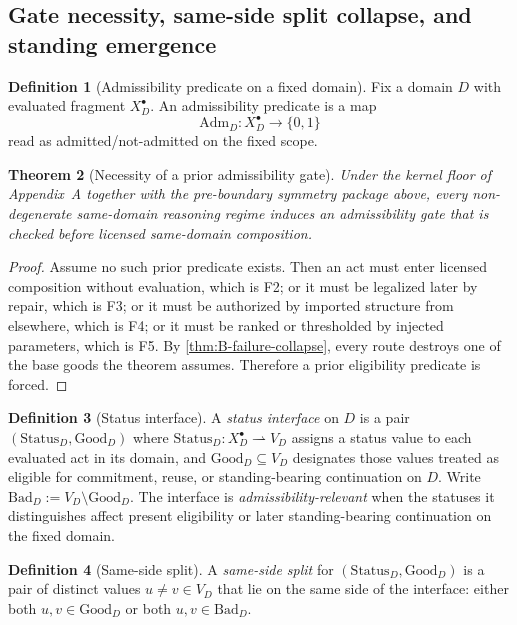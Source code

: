 \documentclass[11pt]{article}
\theoremstyle{plain}
\newtheorem{theorem}{Theorem}[section]
\theoremstyle{definition}
\newtheorem{definition}[theorem]{Definition}
\newcommand{\Adm}{\mathrm{Adm}}
\newcommand{\Eval}{X_D^{\bullet}}
\newcommand{\domain}{D}
\newcommand{\Good}{\mathrm{Good}}
\newcommand{\Bad}{\mathrm{Bad}}
\begin{document}
\subsection{Gate necessity, same-side split collapse, and standing emergence}

\begin{definition}[Admissibility predicate on a fixed domain]
Fix a domain $\domain$ with evaluated fragment $\Eval$. An admissibility predicate is a map
\[
\Adm_\domain:\Eval\to\{0,1\}
\]
read as admitted/not-admitted on the fixed scope.
\end{definition}

\begin{theorem}[Necessity of a prior admissibility gate]
\label{thm:B-gate-necessity}
Under the kernel floor of Appendix~A together with the pre-boundary symmetry package above, every non-degenerate same-domain reasoning regime induces an admissibility gate that is checked before licensed same-domain composition.
\end{theorem}

\begin{proof}
Assume no such prior predicate exists. Then an act must enter licensed composition without evaluation, which is F2; or it must be legalized later by repair, which is F3; or it must be authorized by imported structure from elsewhere, which is F4; or it must be ranked or thresholded by injected parameters, which is F5. By \cref{thm:B-failure-collapse}, every route destroys one of the base goods the theorem assumes. Therefore a prior eligibility predicate is forced.
\end{proof}

\begin{definition}[Status interface]
A \emph{status interface} on $\domain$ is a pair $(\mathrm{Status}_\domain,\Good_\domain)$ where $\mathrm{Status}_\domain:\Eval\rightharpoonup V_\domain$ assigns a status value to each evaluated act in its domain, and $\Good_\domain\subseteq V_\domain$ designates those values treated as eligible for commitment, reuse, or standing-bearing continuation on $\domain$. Write $\Bad_\domain:=V_\domain\setminus \Good_\domain$. The interface is \emph{admissibility-relevant} when the statuses it distinguishes affect present eligibility or later standing-bearing continuation on the fixed domain.
\end{definition}

\begin{definition}[Same-side split]
A \emph{same-side split} for $(\mathrm{Status}_\domain,\Good_\domain)$ is a pair of distinct values $u\neq v\in V_\domain$ that lie on the same side of the interface: either both $u,v\in \Good_\domain$ or both $u,v\in \Bad_\domain$.
\end{definition}
\end{document}
